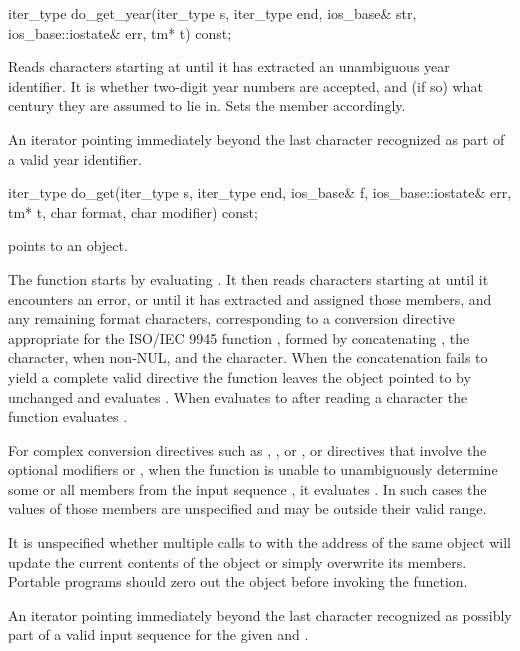 %
\begin{itemdecl}
iter_type do_get_year(iter_type s, iter_type end, ios_base& str,
                      ios_base::iostate& err, tm* t) const;
\end{itemdecl}

\begin{itemdescr}
\pnum
\effects
Reads characters starting at 
until it has extracted an unambiguous year identifier.
It is
 whether
two-digit year numbers are accepted,
and (if so) what century they are assumed to lie in.
Sets the
member accordingly.

\pnum
\returns
An iterator pointing immediately beyond the last character recognized
as part of a valid year identifier.
\end{itemdescr}

%
\begin{itemdecl}
iter_type do_get(iter_type s, iter_type end, ios_base& f,
                 ios_base::iostate& err, tm* t, char format, char modifier) const;
\end{itemdecl}

\begin{itemdescr}
\pnum
\expects
{} points to an object.

\pnum
\effects
The function starts by evaluating
. It
then reads characters starting at  until it encounters an error, or
until it has extracted and assigned those  members, and any
remaining format characters, corresponding to a conversion directive
appropriate for the ISO/IEC 9945 function , formed by
concatenating , the  character,
when non-NUL, and the 
character. When the concatenation fails to yield a complete valid
directive the function leaves the object pointed to by  unchanged and
evaluates . When 
evaluates to  after reading a character the function evaluates
.

\pnum
For complex conversion directives such as ,
, or , or directives
that involve the optional modifiers  or ,
when the function is unable
to unambiguously determine some or all  members from the input
sequence , it evaluates .
In such cases the values of those  members are unspecified
and may be outside their valid range.

\pnum
\remarks
It is unspecified whether multiple calls to
 with the
address of the same  object will update the current contents of
the object or simply overwrite its members. Portable programs should zero
out the object before invoking the function.

\pnum
\returns
An iterator pointing immediately beyond the last character
recognized as possibly part of a valid input sequence for the given
 and .
\end{itemdescr}

